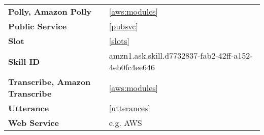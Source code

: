 \begin{flushleft}
\begin{tabular}{ll}
\textbf{Polly, Amazon Polly}&		\ref{aws:modules}\\
\textbf{Public Service}			&	\ref{pubsvc}\\
\textbf{Slot}				&		\ref{slots}\\
\textbf{Skill ID}			&	amzn1.ask.skill.d7732837-fab2-42ff-a152-4eb0fc4ee646\\
\textbf{Transcribe, Amazon Transcribe}	&		\ref{aws:modules}\\

\textbf{Utterance}			&		\ref{utterances}\\



\textbf{Web Service}			&		e.g. AWS\\







\end{tabular}
\end{flushleft}
